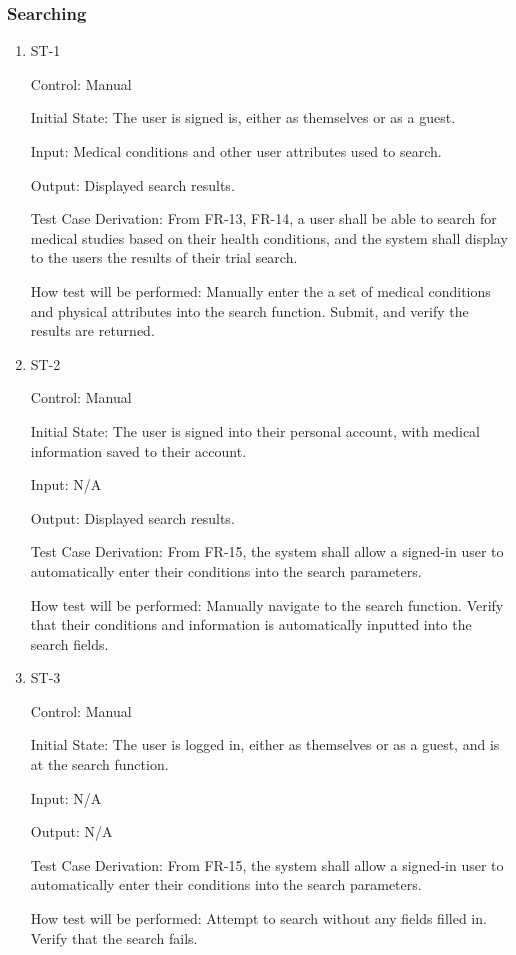 \documentclass[12pt, titlepage]{article}
\begin{document}
\subsubsection{Searching}

\begin{enumerate}

\item{ST-1\\}

Control: Manual
					
Initial State: The user is signed is, either as themselves or as a guest.
					
Input: Medical conditions and other user attributes used to search.
					
Output: Displayed search results.

Test Case Derivation: From FR-13, FR-14, a user shall be able to search for medical studies based on their health conditions, and the system shall display to the users the results of their trial search.

How test will be performed: Manually enter the a set of medical conditions and physical attributes into the search function. Submit, and verify the results are returned.


\item{ST-2\\}

Control: Manual
					
Initial State: The user is signed into their personal account, with medical information saved to their account.
					
Input: N/A
					
Output: Displayed search results.

Test Case Derivation: From FR-15, the system shall allow a signed-in user to automatically enter their conditions into the search parameters.

How test will be performed: Manually navigate to the search function. Verify that their conditions and information is automatically inputted into the search fields.


\item{ST-3\\}

Control: Manual
					
Initial State: The user is logged in, either as themselves or as a guest, and is at the search function.
					
Input: N/A
					
Output: N/A

Test Case Derivation: From FR-15, the system shall allow a signed-in user to automatically enter their conditions into the search parameters.

How test will be performed: Attempt to search without any fields filled in. Verify that the search fails.

\end{enumerate}
\end{document}
